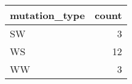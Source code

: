 
\begin{tabular}{l|r}
\hline
mutation\_type & count\\
\hline
SW & 3\\
\hline
WS & 12\\
\hline
WW & 3\\
\hline
\end{tabular}

